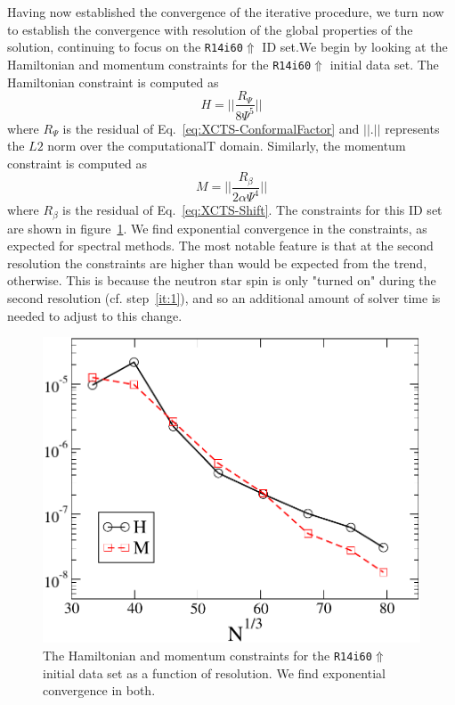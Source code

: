 Having now established the convergence of the iterative procedure, we
turn now to establish the convergence with resolution of the global
properties of the solution, continuing to focus on the {\tt R14i60$\Uparrow$} ID set.We begin by looking at the Hamiltonian and momentum constraints for the {\tt R14i60$\Uparrow$} initial data set.
The Hamiltonian constraint is computed as
\begin{equation}
H=||\frac{R_{\Psi}}{8\Psi^5}||
\end{equation}
where $R_{\Psi}$ is the residual of Eq.~\ref{eq:XCTS-ConformalFactor}
and $||.||$ represents the $L2$ norm over the computationalT
domain. Similarly, the momentum constraint is computed as
\begin{equation}
M = ||\frac{R_{\beta}}{2\alpha\Psi^4}||
\end{equation}
where $R_{\beta}$ is the residual of Eq.~\ref{eq:XCTS-Shift}.
The constraints for this ID set are shown in figure~\ref{fig:HamMom}. We find exponential convergence in the constraints, as expected for spectral methods. The most notable feature
is that at the second resolution the constraints are higher than would be expected
from the trend, otherwise. This is because the neutron star spin is
only "turned on" during the second resolution (cf. step~\ref{it:1}), and so an additional amount of
solver time is needed to adjust to this change.
\begin{figure}\includegraphics[width=0.95\columnwidth]{chap4/HamMom}
\caption[Hamiltonian and momentum constraints of the {\tt R14i60$\Uparrow$} ID set]{\label{fig:HamMom} The Hamiltonian and momentum constraints for the {\tt R14i60$\Uparrow$} initial data set
as a function of resolution. We find exponential convergence in both.}
\end{figure}

